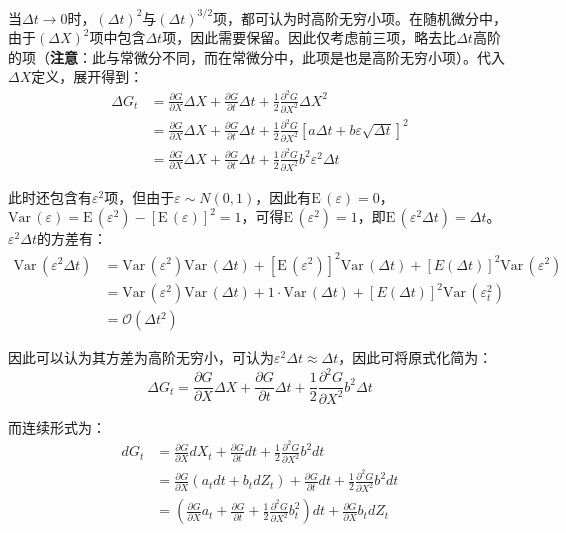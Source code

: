 \documentclass[11pt]{article}
\def\Var{{\textrm{Var}}\,}
\def\E{{\textrm{E}}\,}
\begin{document}
当$\Delta t \rightarrow 0$时，$(\Delta t)^2$与$(\Delta t)^{3/2}$项，都可认为时高阶无穷小项。在随机微分中，由于$(\Delta X)^2$项中包含$\Delta t$项，因此需要保留。因此仅考虑前三项，略去比$\Delta t$高阶的项（\textbf{注意}：此与常微分不同，而在常微分中，此项是也是高阶无穷小项）。代入$\Delta X$定义，展开得到：
\begin{align*}
    \Delta G_t & = \frac{\partial G}{\partial X} \Delta X + \frac{\partial G}{\partial t} \Delta t + \frac{1}{2} \frac{\partial^2 G}{\partial X^2}\Delta X^2 \\
    & = \frac{\partial G}{\partial X} \Delta X + \frac{\partial G}{\partial t} \Delta t + \frac{1}{2} \frac{\partial^2 G}{\partial X^2} [a\Delta t + b\varepsilon\sqrt{\Delta t}]^2 \\
    & = \frac{\partial G}{\partial X} \Delta X + \frac{\partial G}{\partial t} \Delta t + \frac{1}{2} \frac{\partial^2 G}{\partial X^2} b^2 \varepsilon^2 \Delta t
\end{align*}

此时还包含有$\varepsilon^2$项，但由于$\varepsilon \sim N(0,1)$，因此有$\E(\varepsilon)=0$，$\Var(\varepsilon)=\E(\varepsilon^2)-[\E(\varepsilon)]^2=1$，可得$\E(\varepsilon^2)=1$，即$\E(\varepsilon^2 \Delta t) = \Delta t$。$\varepsilon^2 \Delta t$的方差有：
\begin{align*}
    \Var(\varepsilon^2 \Delta t) & = \Var(\varepsilon^2) \Var(\Delta t) + [\E(\varepsilon^2)]^2 \Var(\Delta t) + [E(\Delta t)]^2 \Var(\varepsilon^2) \\
    & = \Var(\varepsilon^2) \Var(\Delta t) + 1 \cdot \Var(\Delta t) + [E(\Delta t)]^2 \Var(\varepsilon_t^2) \\
    & = \mathcal{O}(\Delta t^2)
\end{align*}

因此可以认为其方差为高阶无穷小，可认为$\varepsilon^2 \Delta t \approx \Delta t$，因此可将原式化简为：
\begin{equation*}
    \Delta G_t = \frac{\partial G}{\partial X} \Delta X + \frac{\partial G}{\partial t} \Delta t + \frac{1}{2} \frac{\partial^2 G}{\partial X^2} b^2 \Delta t
\end{equation*}

而连续形式为：
\begin{align*}
    dG_t & = \frac{\partial G}{\partial X}  dX_t + \frac{\partial G}{\partial t} dt + \frac{1}{2} \frac{\partial^2 G}{\partial X^2} b^2 dt \\
    & = \frac{\partial G}{\partial X} (a_t dt + b_t dZ_t) + \frac{\partial G}{\partial t} dt + \frac{1}{2} \frac{\partial^2 G}{\partial X^2} b^2 dt \\
    & = \left(\frac{\partial G}{\partial X}a_t  + \frac{\partial G}{\partial t} + \frac{1}{2}\frac{\partial^2 G}{\partial X^2} b^2_t \right)dt + \frac{\partial G}{\partial X} b_t dZ_t
\end{align*}
\end{document}
